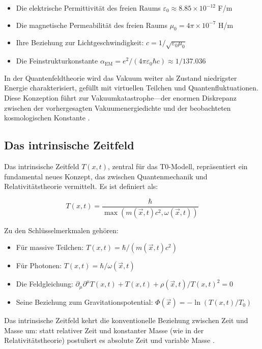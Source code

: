 \documentclass[12pt,a4paper]{article}
\newcommand{\Tfieldt}{T(x,t)}
\newcommand{\alphaEM}{\alpha_{\text{EM}}}
\newcommand{\Tzero}{T_0}
\newcommand{\vecx}{\vec{x}}
\begin{document}
	\begin{itemize}
		\item Die elektrische Permittivität des freien Raums $\varepsilon_0 \approx 8.85 \times 10^{-12}$ F/m
		\item Die magnetische Permeabilität des freien Raums $\mu_0 = 4\pi \times 10^{-7}$ H/m
		\item Ihre Beziehung zur Lichtgeschwindigkeit: $c = 1/\sqrt{\varepsilon_0\mu_0}$
		\item Die Feinstrukturkonstante $\alphaEM = e^2/(4\pi\varepsilon_0\hbar c) \approx 1/137.036$
	\end{itemize}
	
	In der Quantenfeldtheorie wird das Vakuum weiter als Zustand niedrigster Energie charakterisiert, gefüllt mit virtuellen Teilchen und Quantenfluktuationen. Diese Konzeption führt zur Vakuumkatastrophe—der enormen Diskrepanz zwischen der vorhergesagten Vakuumenergiedichte und der beobachteten kosmologischen Konstante \cite{Weinberg1989}.
	
	\subsection{Das intrinsische Zeitfeld}
	\label{subsec:time_field}
	
	Das intrinsische Zeitfeld $\Tfieldt$, zentral für das T0-Modell, repräsentiert ein fundamental neues Konzept, das zwischen Quantenmechanik und Relativitätstheorie vermittelt. Es ist definiert als:
	
	\begin{equation}
		\Tfieldt = \frac{\hbar}{\max(m(\vecx,t)c^2, \omega(\vecx,t))}
	\end{equation}
	
	Zu den Schlüsselmerkmalen gehören:
	
	\begin{itemize}
		\item Für massive Teilchen: $\Tfieldt = \hbar/(m(\vecx,t)c^2)$
		\item Für Photonen: $\Tfieldt = \hbar/\omega(\vecx,t)$
		\item Die Feldgleichung: $\partial_{\mu}\partial^{\mu}\Tfieldt + \Tfieldt + \rho(\vecx,t)/\Tfieldt^2 = 0$
		\item Seine Beziehung zum Gravitationspotential: $\Phi(\vecx) = -\ln(\Tfieldt/\Tzero)$
	\end{itemize}
	
	Das intrinsische Zeitfeld kehrt die konventionelle Beziehung zwischen Zeit und Masse um: statt relativer Zeit und konstanter Masse (wie in der Relativitätstheorie) postuliert es absolute Zeit und variable Masse \cite{pascher_part1_2025}.
	
\end{document}
